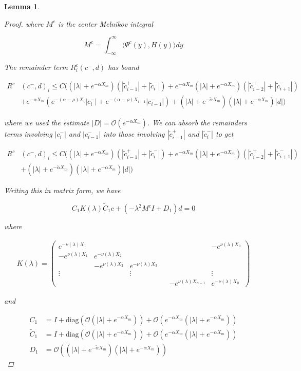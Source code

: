 \documentclass[12pt]{article}
\newtheorem{lemma}{Lemma}
\begin{document}
\begin{lemma}
\begin{proof}
where $M^c$ is the center Melnikov integral

\[
M^c = \int_{-\infty}^\infty \langle \Psi^c(y), H(y) \rangle dy 
\]

The remainder term $R^c_i(c^-, d)$ has bound

\begin{align*}
R^c&(c^-, d)_i \leq C \Big(
(|\lambda| + e^{-\alpha X_m})(|\tilde{c}_{i-1}^+| + |\tilde{c}_{i}^-|) + e^{-\alpha X_m}(|\lambda| + e^{-\alpha X _m})( |\tilde{c}_{i-2}^+| + |\tilde{c}_{i+1}^-|)  \\
&+ e^{-\alpha X_m}( e^{-(\alpha - \rho) X_i}|c_i^-| + e^{-(\alpha - \rho) X_{i-1}}|c_{i-1}^-| )
+ (|\lambda| + e^{-\tilde{\alpha} X_m})(|\lambda| + e^{-\alpha X_m})|d|
\Big)
\end{align*}

where we used the estimate $|D| = \mathcal{O}(e^{-\alpha X_m})$. We can absorb the remainders terms involving $|c_i^-|$ and $|c_{i-1}^-|$ into those involving $|\tilde{c}_{i-1}^+|$ and $|\tilde{c}_{i}^-|$ to get

\begin{align*}
R^c&(c^-, d)_i \leq C \Big(
(|\lambda| + e^{-\alpha X_m})(|\tilde{c}_{i-1}^+| + |\tilde{c}_{i}^-|) + e^{-\alpha X_m}(|\lambda| + e^{-\alpha X _m})( |\tilde{c}_{i-2}^+| + |\tilde{c}_{i+1}^-|)  \\
&+ (|\lambda| + e^{-\tilde{\alpha} X_m})(|\lambda| + e^{-\alpha X_m})|d|
\Big)
\end{align*}

Writing this in matrix form, we have

\[
C_1 K(\lambda) \tilde{C}_1 c + (-\lambda^2 M^c I + D_1)d = 0
\]

where

\begin{align*}
K(\lambda) =  
\begin{pmatrix}
e^{-\nu(\lambda)X_1} & & & & & -e^{\nu(\lambda)X_0} \\
-e^{\nu(\lambda)X_1} & e^{-\nu(\lambda)X_2} \\
& -e^{\nu(\lambda)X_2} & e^{-\nu(\lambda)X_3} \\
\vdots & & \vdots & &&  \vdots \\
& & & & -e^{\nu(\lambda)X_{n-1}} & e^{-\nu(\lambda)X_0} 
\end{pmatrix}
\end{align*}

and

\begin{align*}
C_1 &= I + \text{diag}(\mathcal{O}(|\lambda| + e^{-\alpha X_m})) 
+ \mathcal{O}(e^{-\alpha X_m}( |\lambda| + e^{-\alpha X_m}))\\
\tilde{C}_1 &= I + \text{diag}(\mathcal{O}(|\lambda| + e^{-\alpha X_m})) 
+ \mathcal{O}(e^{-\alpha X_m}( |\lambda| + e^{-\alpha X_m}))\\
D_1 &= \mathcal{O}((|\lambda| + e^{-\tilde{\alpha} X_m})(|\lambda| + e^{-\alpha X_m}))
\end{align*}


\end{proof}
\end{lemma}
\end{document}
